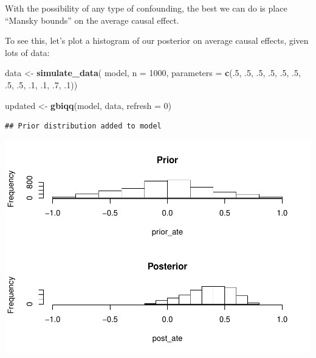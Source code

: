 \documentclass[12pt,]{book}
\newenvironment{Shaded}{\begin{snugshade}}{\end{snugshade}}
\newcommand{\DataTypeTok}[1]{\textcolor[rgb]{0.13,0.29,0.53}{#1}}
\newcommand{\DecValTok}[1]{\textcolor[rgb]{0.00,0.00,0.81}{#1}}
\newcommand{\FloatTok}[1]{\textcolor[rgb]{0.00,0.00,0.81}{#1}}
\newcommand{\KeywordTok}[1]{\textcolor[rgb]{0.13,0.29,0.53}{\textbf{#1}}}
\newcommand{\NormalTok}[1]{#1}
\newcommand{\StringTok}[1]{\textcolor[rgb]{0.31,0.60,0.02}{#1}}
\begin{document}
With the possibility of any type of confounding, the best we can do is place ``Mansky bounds'' on the average causal effect.

To see this, let's plot a histogram of our posterior on average causal effects, given lots of data:

\begin{Shaded}
\begin{Highlighting}[]
\NormalTok{data <-}\StringTok{ }\KeywordTok{simulate_data}\NormalTok{(}
\NormalTok{    model, }\DataTypeTok{n =} \DecValTok{1000}\NormalTok{, }
    \DataTypeTok{parameters =} \KeywordTok{c}\NormalTok{(.}\DecValTok{5}\NormalTok{, }\FloatTok{.5}\NormalTok{, }\FloatTok{.5}\NormalTok{, }\FloatTok{.5}\NormalTok{, }\FloatTok{.5}\NormalTok{, }\FloatTok{.5}\NormalTok{, }\FloatTok{.5}\NormalTok{, }\FloatTok{.5}\NormalTok{, }\FloatTok{.1}\NormalTok{, }\FloatTok{.1}\NormalTok{, }\FloatTok{.7}\NormalTok{, }\FloatTok{.1}\NormalTok{))}
\end{Highlighting}
\end{Shaded}

\begin{Shaded}
\begin{Highlighting}[]
\NormalTok{updated <-}\StringTok{ }\KeywordTok{gbiqq}\NormalTok{(model, data, }\DataTypeTok{refresh =} \DecValTok{0}\NormalTok{)}
\end{Highlighting}
\end{Shaded}

\begin{verbatim}
## Prior distribution added to model
\end{verbatim}

\includegraphics{ii_files/figure-latex/unnamed-chunk-110-1.pdf}
\end{document}
